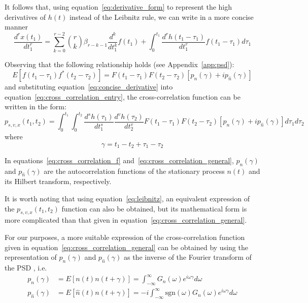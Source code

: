 \documentclass[11pt]{article}
\begin{document}
It follows that, using equation~\eqref{eq:derivative_form} to represent the high derivatives of $h(t)$ instead of the Leibnitz rule, we can write in a more concise manner
\begin{equation}
\frac{d^r x(t_1)}{dt_1^r} = \sum_{k=0}^{r-2} \binom{r}{k} \beta_{r-k-1} \frac{d^k}{dt_1^k} f(t_1) + \int_0^{t_1} \frac{d^r h(t_1 - \tau_1)}{dt_1^r} f(t_1 - \tau_1) d\tau_1
\label{eq:concise_derivative}
\end{equation}

Observing that the following relationship holds (see Appendix~\ref{app:psd}):
\begin{equation}
E[f(t_1 - \tau_1)f^*(t_2 - \tau_2)] = F(t_1 - \tau_1)F(t_2 - \tau_2)[p_n(\gamma) + ip_{\hat{n}}(\gamma)]
\label{eq:cross_correlation_f}
\end{equation}
and substituting equation~\eqref{eq:concise_derivative} into equation~\eqref{eq:cross_correlation_entry}, the cross-correlation function can be written in the form:
\begin{equation}
p_{s,v,x}(t_1, t_2) = \int_0^{t_1} \int_0^{t_2} \frac{d^s h(\tau_1)}{dt_1^s} \frac{d^v h(\tau_2)}{dt_2^v} F(t_1 - \tau_1)F(t_2 - \tau_2)[p_n(\gamma) + ip_{\hat{n}}(\gamma)] d\tau_1 d\tau_2
\label{eq:cross_correlation_general}
\end{equation}
where
\begin{equation}
\gamma = t_1 - t_2 + \tau_1 - \tau_2
\label{eq:gamma}
\end{equation}

In equations~\eqref{eq:cross_correlation_f} and~\eqref{eq:cross_correlation_general}, $p_n(\gamma)$ and $p_{\hat{n}}(\gamma)$ are the autocorrelation functions of the stationary process $n(t)$ and its Hilbert transform, respectively.

It is worth noting that using equation~\eqref{eq:leibnitz}, an equivalent expression of the $p_{s,v,x}(t_1, t_2)$ function can also be obtained, but its mathematical form is more complicated than that given in equation~\eqref{eq:cross_correlation_general}.

For our purposes, a more suitable expression of the cross-correlation function given in equation~\eqref{eq:cross_correlation_general} can be obtained by using the representation of $p_n(\gamma)$ and $p_{\hat{n}}(\gamma)$ as the inverse of the Fourier transform of the PSD \cite{papoulis1984}, i.e.
\begin{align}
p_n(\gamma) &= E[n(t)n(t + \gamma)] = \int_{-\infty}^{\infty} G_n(\omega) e^{i\omega\gamma} d\omega \label{eq:pn_fourier}\\
p_{\hat{n}}(\gamma) &= E[\hat{n}(t)n(t + \gamma)] = -i \int_{-\infty}^{\infty} \text{sgn}(\omega) G_n(\omega) e^{i\omega\gamma} d\omega \label{eq:pnhat_fourier}
\end{align}
\end{document}

